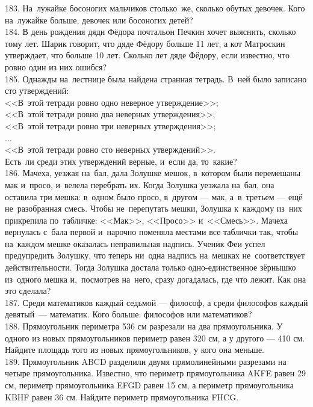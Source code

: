 \documentclass[12pt]{article}
\begin{document}
183. На лужайке босоногих мальчиков столько же, сколько обутых девочек. Кого на лужайке больше, девочек или босоногих детей?\\
184. В день рождения дяди Фёдора почтальон Печкин хочет выяснить, сколько тому лет. Шарик говорит, что дяде Фёдору больше 11 лет, а кот Матроскин утверждает, что больше 10 лет. Сколько лет дяде Фёдору, если известно, что ровно один из них ошибся?\\
185. Однажды на лестнице была найдена странная тетрадь. В ней было записано сто утверждений:\\
<<В этой тетради ровно одно неверное утверждение>>;\\
<<В этой тетради ровно два неверных утверждения>>;\\
<<В этой тетради ровно три неверных утверждения>>;\\
...\\
<<В этой тетради ровно сто неверных утверждений>>.\\
Есть ли среди этих утверждений верные, и если да, то какие?\\
186. Мачеха, уезжая на бал, дала Золушке мешок, в котором были перемешаны мак и просо, и велела перебрать их. Когда Золушка уезжала на бал, она оставила три мешка: в одном было просо, в другом --- мак, а в третьем --- ещё не разобранная смесь. Чтобы не перепутать мешки, Золушка к каждому из них прикрепила по табличке: <<Мак>>, <<Просо>> и <<Смесь>>. Мачеха вернулась с бала первой и нарочно поменяла местами все таблички так, чтобы на каждом мешке оказалась неправильная надпись. Ученик Феи успел предупредить Золушку, что теперь ни одна надпись на мешках не соответствует действительности. Тогда Золушка достала только одно-единственное зёрнышко из одного мешка и, посмотрев на него, сразу догадалась, где что лежит. Как она это сделала?\\
187. Среди математиков каждый седьмой --- философ, а среди философов каждый девятый --- математик. Кого больше: философов или математиков?\\
188. Прямоугольник периметра 536 см разрезали на два прямоугольника. У одного из новых прямоугольников периметр равен 320 см, а у другого --- 410 см. Найдите площадь того из новых прямоугольников, у кого она меньше.\\
189. Прямоугольник ABCD разделили двумя прямолинейными разрезами на четыре прямоугольника. Известно, что периметр прямоугольника AKFE равен 29 см, периметр прямоугольника EFGD равен 15 см,  а периметр прямоугольника KBHF равен 36 см. Найдите периметр прямоугольника FHCG.\\
\end{document}
